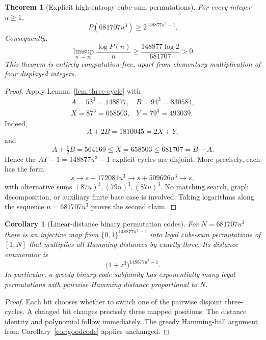\documentclass[10pt]{article}
\newtheorem{theorem}{Theorem}
\newtheorem{corollary}{Corollary}
\begin{document}
\begin{theorem}[Explicit high-entropy cube-sum permutations]
\label{thm:three-cycle}
For every integer $u\ge1$,
\begin{equation}\label{eq:three-cycle}
\boxed{\displaystyle
P(681707u^3)\ge2^{148877u^3-1}.}
\end{equation}
Consequently,
\begin{equation}\label{eq:three-cycle-rate}
\boxed{\displaystyle
\limsup_{n\to\infty}\frac{\log P(n)}n
\ge \frac{148877\log2}{681707}>0.}
\end{equation}
This theorem is entirely computation-free,
apart from elementary multiplication of
four displayed integers.
\end{theorem}
\begin{proof}
Apply Lemma~\ref{lem:three-cycle} with
\[
\begin{array}{ll}
A=53^3=148877,&B=94^3=830584,\\
X=87^3=658503,&Y=79^3=493039.
\end{array}
\]
Indeed,
\[
A+2B=1810045=2X+Y,
\]
and
\[
A+\tfrac12B=564169
\le X=658503\le681707=B-A.
\]
Hence the $AT-1=148877u^3-1$
explicit cycles are disjoint. More precisely,
each has the form
\[
s\longrightarrow s+172081u^3
\longrightarrow s+509626u^3
\longrightarrow s,
\]
with alternative sums $(87u)^3,(79u)^3,(87u)^3$.
No matching search, graph decomposition,
or auxiliary finite base case is involved.
Taking logarithms along the sequence
$n=681707u^3$ proves the second claim.
\end{proof}

\begin{corollary}[Linear-distance binary permutation codes]
\label{cor:three-cycle-codes}
For $N=681707u^3$ there is an injective
map from $\{0,1\}^{148877u^3-1}$
into legal cube-sum permutations of $[1,N]$
that multiplies all Hamming distances by
exactly three. Its distance enumerator is
\[
\bigl(1+z^3\bigr)^{148877u^3-1}.
\]
In particular, a greedy binary code
subfamily has exponentially many legal
permutations with pairwise Hamming
distance proportional to $N$.
\end{corollary}
\begin{proof}
Each bit chooses whether to switch one
of the pairwise disjoint three-cycles.
A changed bit changes precisely three
mapped positions. The distance identity
and polynomial follow immediately.
The greedy Hamming-ball argument from
Corollary~\ref{cor:goodcode} applies
unchanged.
\end{proof}
\end{document}
